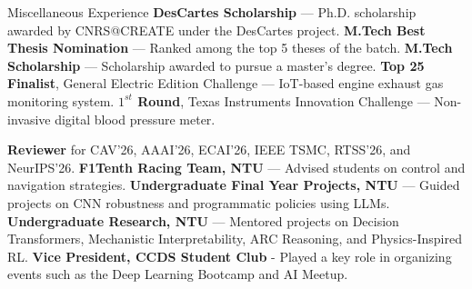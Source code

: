 \begin{rubric}{Miscellaneous Experience}
\entry*[2023] \textbf{DesCartes Scholarship} — Ph.D. scholarship awarded by CNRS@CREATE under the DesCartes project.  
\entry*[2021] \textbf{M.Tech Best Thesis Nomination} — Ranked among the top 5 theses of the batch.
\entry*[2019] \textbf{M.Tech Scholarship} — Scholarship awarded to pursue a master's degree.
\entry*[2016] \textbf{Top 25 Finalist}, General Electric Edition Challenge — IoT-based engine exhaust gas monitoring system.
\entry*[2015] \textbf{$1^{st}$ Round}, Texas Instruments Innovation Challenge — Non-invasive digital blood pressure meter.

\entry*[Reviewer] \textbf{Reviewer} for CAV'26, AAAI’26, ECAI’26, IEEE TSMC, RTSS'26, and NeurIPS'26.
\entry*[F1Tenth] \textbf{F1Tenth Racing Team, NTU} — Advised students on control and navigation strategies.
\entry*[FYP] \textbf{Undergraduate Final Year Projects, NTU} — Guided projects on CNN robustness and programmatic policies using LLMs.
\entry*[URECA] \textbf{Undergraduate Research, NTU} — Mentored projects on Decision Transformers, Mechanistic Interpretability, ARC Reasoning, and Physics-Inspired RL.
\entry*[Leadership] \textbf{Vice President, CCDS Student Club} - Played a key role in organizing events such as the Deep Learning Bootcamp and AI Meetup.

\end{rubric}
